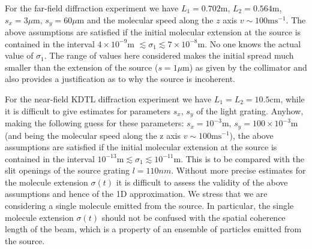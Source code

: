 \documentclass[12pt,groupedaddress,pra,aps]{revtex4-1}
\begin{document}
For the far-field diffraction experiment \cite{MSCH} we have $L_1 = 0.702\text{m}$, $L_2=0.564\text{m}$, $s_x=3 \mu\text{m}$, $s_y=60\mu\text{m}$  and  the molecular speed along the $z$ axis $v \sim 100\text{ms}^{-1}$. The above assumptions are satisfied if the initial molecular extension at the source is contained in the interval $4 \times 10^{-9}\text{m}$ $\lesssim  \sigma_1 \lesssim  7\times 10^{-8}\text{m}$. No one knows the actual value of $\sigma_1$. The range of values here considered makes the initial spread much smaller than the extension of the source ($s=1\mu\text{m}$) as given by the collimator and also provides a justification as to why the source is incoherent. 

For the near-field KDTL diffraction experiment \cite{C3CP51500A} we have $L_1=L_2=10.5 \text{cm}$, while it is difficult to give estimates for parameters $s_x$, $s_y$ of the light grating. Anyhow, making the following guess for these  parameters: $s_x= 10^{-3}\text{m}$, $s_y= 100 \times 10^{-3}\text{m}$ (and being the molecular speed along the z axis $v \sim 100\text{ms}^{-1}$), the above assumptions are satisfied if the initial molecular extension at the source is contained in the interval $10^{-13}\text{m} \lesssim  \sigma_1 \lesssim  10^{-11}\text{m}$. This is to be compared with the slit openings of the source grating $l=110nm$. Without more precise estimates for the molecule extension $\sigma(t)$ it is difficult to assess the validity of the above assumptions and hence of the 1D approximation. We stress  that we are considering a single molecule emitted from the source. In particular, the single molecule extension $\sigma(t)$ should not be confused with the spatial coherence length of the beam, which is a property of an ensemble of particles emitted from the source.
\end{document}
